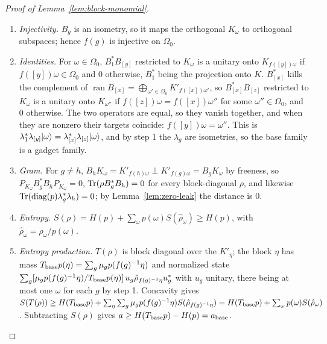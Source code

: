 \begin{proof}[Proof of Lemma~\ref{lem:block-monomial}]
\begin{enumerate}[label=\arabic*.,itemsep=1pt]
\item \emph{Injectivity.} $B_g$ is an isometry, so it maps the orthogonal $K_\omega$ to orthogonal subspaces; hence $f(g)$ is injective on $\Omega_0$.
\item \emph{Identities.} For $\omega\in\Omega_0$, $B_1^*B_{[y]}$ restricted to $K_\omega$ is a unitary onto $K_{f([y])\omega}$ if $f([y])\omega\in\Omega_0$ and $0$ otherwise, $B_1^*$ being the
projection onto $K$. $B_{[x]}^*$ kills the complement of $\operatorname{ran}B_{[x]}=\bigoplus_{\omega'\in\Omega_0}K'_{f([x])\omega'}$, so $B_{[x]}^*B_{[z]}$ restricted to $K_\omega$ is a
unitary onto $K_{\omega''}$ if $f([z])\omega=f([x])\omega''$ for some $\omega''\in\Omega_0$, and $0$ otherwise. The two operators are equal, so they vanish together, and when
they are nonzero their targets coincide: $f([y])\omega=\omega''$. This is $\lambda_1^*\lambda_{[y]}\lvert \omega\rangle=\lambda_{[x]}^*\lambda_{[z]}\lvert \omega\rangle$, and by step 1 the
$\lambda_g$ are isometries, so the base family is a gadget family.
\item \emph{Gram.} For $g\ne h$, $B_hK_\omega=K'_{f(h)\omega}\perp K'_{f(g)\omega}=B_gK_\omega$ by freeness, so $P_{K_\omega}B_g^*B_hP_{K_\omega}=0$, $\operatorname{Tr}(\rho B_g^*B_h)=0$ for every block-diagonal
$\rho$, and likewise $\operatorname{Tr}(\operatorname{diag}(p)\lambda_g^*\lambda_h)=0$; by Lemma~\ref{lem:zero-leak} the distance is $0$.
\item \emph{Entropy.} $S(\rho)=H(p)+\sum_\omega p(\omega)S(\hat\rho_\omega)\ge H(p)$, with $\hat\rho_\omega=\rho_\omega/p(\omega)$.
\item \emph{Entropy production.} $T(\rho)$ is block diagonal over the $K'_\eta$; the block $\eta$ has mass $T_{\rm base}p(\eta)=\sum_g\mu_gp(f(g)^{-1}\eta)$ and normalized state
$\sum_g[\mu_gp(f(g)^{-1}\eta)/T_{\rm base}p(\eta)]\,u_g\hat\rho_{f(g)^{-1}\eta}u_g^*$ with $u_g$ unitary, there being at most one $\omega$ for each $g$ by step 1. Concavity gives
$S(T(\rho))\ge H(T_{\rm base}p)+\sum_\eta\sum_g\mu_gp(f(g)^{-1}\eta)S(\hat\rho_{f(g)^{-1}\eta})=H(T_{\rm base}p)+\sum_\omega p(\omega)S(\hat\rho_\omega)$. Subtracting $S(\rho)$ gives
$a\ge H(T_{\rm base}p)-H(p)=a_{\rm base}$.\qedhere
\end{enumerate}
\end{proof}

